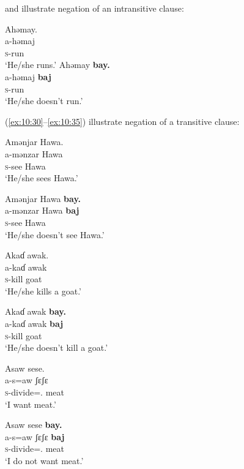  and  illustrate negation of an intransitive clause:

\ea \label{ex:10:28}
Ahəmay.\\
\gll  a-həmaj\\
      \textsc{s}-run\\
\glt  ‘He/she runs.’            
\z
\clearpage
\ea \label{ex:10:29}
Ahəmay  \textbf{bay.}\\
\gll  a-həmaj     \textbf{baj}\\
      \textsc{s}-run    {\NEG}\\
\glt  ‘He/she doesn’t run.’
\z

(\ref{ex:10:30}--\ref{ex:10:35}) illustrate negation of a transitive clause:

\ea \label{ex:10:30}
Amənjar  Hawa. \\
\gll  a-mənzar   Hawa\\
      \textsc{s}-see  Hawa\\
\glt  ‘He/she sees Hawa.’           
\z

\ea \label{ex:10:31}
Amənjar  Hawa  \textbf{bay.}\\
\gll  a-mənzar   Hawa   \textbf{baj}\\
      \textsc{s}-see  Hawa  {\NEG}\\
\glt  ‘He/she doesn’t see Hawa.’
\z

\ea \label{ex:10:32}
Akaɗ  awak.\\
\gll  a-kaɗ   awak\\
      \textsc{s}-kill  goat\\
\glt  ‘He/she kills a goat.’          
\z

\ea \label{ex:10:33}
Akaɗ  awak  \textbf{bay.}\\
\gll  a-kaɗ   awak   \textbf{baj}\\
      \textsc{s}-kill  goat  {\NEG}\\
\glt  ‘He/she doesn’t kill a goat.’
\z

\ea \label{ex:10:34}
Asaw sese.\\
\gll  a-s=aw  ʃɛʃɛ\\
      \textsc{s}-divide={\oneS}.{\IO}  meat\\
\glt  ‘I want meat.’            
\z

\ea \label{ex:10:35}
Asaw  sese  \textbf{bay.}\\
\gll  a-s=aw     ʃɛʃɛ   \textbf{baj}\\
      \textsc{s}-divide={\oneS}.{\IO}   meat  {\NEG}\\
\glt  ‘I do not want meat.’
\z

